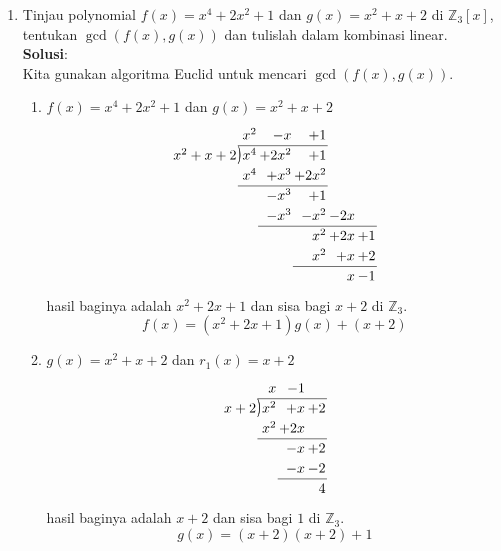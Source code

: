 \documentclass[10pt,openany,a4paper]{article}
\newcommand{\longdiv}{\smash{\mkern-0.43mu\vstretch{1.31}{\hstretch{.7}{)}}\mkern-5.2mu\vstretch{1.31}{\hstretch{.7}{)}}}}
\newcommand{\Z}{\mathbb{Z}}
\newcommand{\jawab}{\textbf{Solusi}:}
\begin{document}
\begin{enumerate}
    \item Tinjau polynomial $f(x)=x^4+2x^2+1$ dan $g(x)=x^2+x+2$ di $\Z_3[x]$, tentukan $\gcd(f(x),g(x))$ dan tulislah dalam kombinasi linear.\\
    \jawab\\
    Kita gunakan algoritma Euclid untuk mencari $\gcd(f(x),g(x))$.
    \begin{enumerate}[label=(\roman*)]
        \item $f(x)=x^4+2x^2+1$ dan $g(x)=x^2+x+2$
        \[
        \arraycolsep=1pt
        \renewcommand\arraystretch{1.2}
        \begin{array}{*1r @{\hskip\arraycolsep}c@{\hskip\arraycolsep} *{11}r}
            & &x^2&-x&+1&\\
    \cline{2-5}
    x^2+x+2 & \longdiv & x^4 & + 2x^2 &+ 1  \\
            &  & x^4 &+ x^3 & + 2x^2  \\
    \cline{2-5}
            &  & &-x^3 &+ 1  \\
            &  & &-x^3 &-x^2 &-2x  \\
    \cline{4-7}
            &  & & &x^2 &+2x &+ 1  \\
            &  & & &x^2 &+ x &+2  \\
    \cline{5-7}
            &  & & & &x &-1  \\
    \end{array}\]
    hasil baginya adalah $x^2+2x+1$ dan sisa bagi $x+2$ di $\Z_3$. 
    \begin{equation}\label{1}
        f(x)=(x^2+2x+1)g(x)+(x+2)
    \end{equation}
        \item $g(x)=x^2+x+2$ dan $r_1(x)=x+2$
        \[\arraycolsep=1pt
        \renewcommand\arraystretch{1.2}
        \begin{array}{*1r @{\hskip\arraycolsep}c@{\hskip\arraycolsep} *{11}r}
        & & x &-1 &\\
        \cline{2-5}
        x+2 & \longdiv & x^2 & +x & +2 \\
        & & x^2 & +2x\\
        \cline{2-5}
        & & & -x & +2 \\
        & & & -x & -2 \\
        \cline{4-5}
        & & & & 4
        \end{array}\]
        hasil baginya adalah $x+2$ dan sisa bagi $1$ di $\Z_3$.
        \begin{equation}\label{2}
            g(x)=(x+2)(x+2)+1
        \end{equation}

\end{enumerate}
\end{enumerate}
\end{document}
